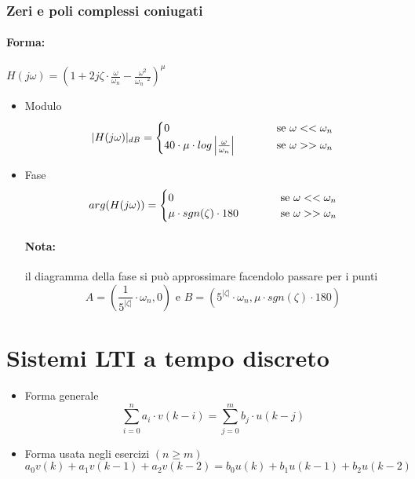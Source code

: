 \documentclass[a4paper]{article}
\begin{document}
	\subsubsection{Zeri e poli complessi coniugati}
	\paragraph{Forma:} $H(j\omega) = \left( 1+2j\zeta \cdot \frac{\omega}{\omega_n} - \frac{\omega^2}{\omega^{\text{ }\text{ }2}_n} \right)^\mu$
	\begin{itemize}
		\item Modulo
			\[
			|H(j\omega)|_{dB} =
				\begin{cases}
				0& \hspace{1.0cm} \text{se } \omega << \omega_n \\
				40\cdot \mu \cdot log \left| \frac{\omega}{\omega_n} \right|& \hspace{1.0cm} \text{se } \omega >> \omega_n
				\end{cases}
			\]
		\item Fase
			\[
			arg(H(j\omega)) =
				\begin{cases}
				0& \hspace{1.0cm} \text{se } \omega << \omega_n \\
				\mu \cdot sgn(\zeta) \cdot 180& \hspace{1.0cm} \text{se } \omega >> \omega_n
				\end{cases}
			\]
			\paragraph{Nota:}
			il diagramma della fase si può approssimare facendolo passare per i punti
			\[
			A = \left( \frac{1}{5^{|\zeta|}} \cdot \omega_n, 0 \right) \text{ e } B = \left( 5^{|\zeta|} \cdot \omega_n, \mu \cdot sgn(\zeta) \cdot 180 \right)
			\]
	\end{itemize}
	
	
	\section{Sistemi LTI a tempo discreto}
	
	\begin{itemize}
		\item Forma generale
			\[ \sum_{i=0}^n a_i \cdot v(k-i) = \sum_{j=0}^m b_j \cdot u(k-j) \]
		\item Forma usata negli esercizi $(n \geq m)$
			\[ a_0 v(k) + a_1 v(k-1) + a_2 v(k-2) = b_0 u(k) + b_1 u(k-1) + b_2 u(k-2) \]
	\end{itemize}
	
\end{document}
